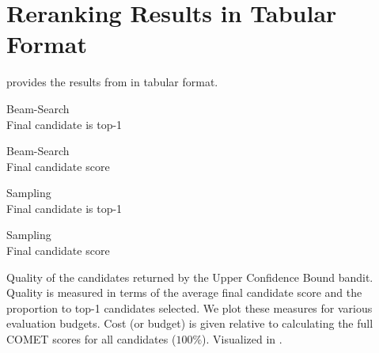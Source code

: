 \section{Reranking Results in Tabular Format}
\label{app:reranking_results_table}

 provides the results from  in tabular format.

\begin{table*}
\small
\centering
\begin{minipage}{0.2\linewidth}
\centering
\vspace{1em}
Beam-Search\\
Final candidate is top-1
\end{minipage}


\begin{minipage}{0.2\linewidth}
\centering
Beam-Search\\
Final candidate score
\end{minipage}


\begin{minipage}{0.2\linewidth}
\centering
Sampling\\
Final candidate is top-1
\end{minipage}


\begin{minipage}{0.2\linewidth}
\centering
Sampling\\
Final candidate score
\end{minipage}


\caption{
    Quality of the candidates returned by the Upper Confidence Bound bandit. Quality is measured in terms of the average final candidate score and the proportion to top-1 candidates selected. We plot these measures for various evaluation budgets. Cost (or budget) is given relative to calculating the full COMET scores for all candidates ($100\%$).
    Visualized in .
}
\label{tab:bandit}
\end{table*}




